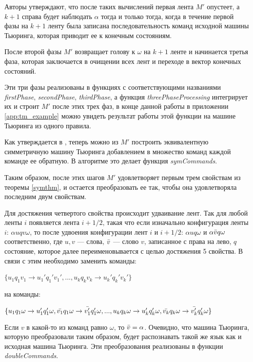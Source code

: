 \documentclass[14pt]{matmex-diploma-custom}
\begin{document}
Авторы утверждают, что после таких вычислений первая лента $M'$  опустеет, а $k+1$ справа будет наблюдать $\alpha$ тогда и только тогда, когда в течение первой фазы на $k+1$ ленту была записана последовательность команд исходной машины Тьюринга, которая приводит ее к конечным состояниям. 

После второй фазы $M'$ возвращает голову к $\omega$ на $k+1$ ленте и начинается третья фаза, которая заключается в очищении всех лент и переходе в вектор конечных состояний. 

Эти три фазы реализованы в функциях с соответствующими названиями \textit{firstPhase}, \textit{secondPhase}, \textit{thirdPhase}, а функция \textit{threePhaseProcessing} интегрирует их и строит $M'$ после этих трех фаз, в конце данной работы в приложении \ref{app:tm_example} можно увидеть результат работы этой функции на машине Тьюринга из одного правила. 

Как утверждается в \cite{symTM}, теперь можно из $M'$ построить эквивалентную симметричную машину Тьюринга добавлением в множество команд каждой команде ее обратную. В алгоритме это делает функция \textit{symCommands}. 

Таким образом, после этих шагов $M'$ удовлетворяет первым трем свойствам из теоремы \ref{symthm}, и остается преобразовать ее так, чтобы она удовлетворяла последним двум свойствам. 

Для достяжения четвертого свойства происходит удваивание лент. Так для любой ленты $i$ появляется лента $i + 1/2$, такая что если изначально конфигурация ленты $i$: $\alpha u q v \omega$, то после удвоения конфигурации лент $i$ и $i+1/2$: $\alpha u q \omega$ и $\alpha \Bar{v} q \omega$ соответственно, где $u,v$ --- слова, $\Bar{v}$ --- слово $v$, записанное с права на лево, $q$ состояние, которое далее переименовывается с целью достяжения 5 свойства. В связи с этим необходимо заменить команды:
\begin{center}
    $\{ u_1 q_1 v_1 \to u_1' q_1' v_1',  ... , u_k q_k v_k \to u_k' q_k' v_k' \}$
\end{center}
на команды:
\begin{center}
    $\{ u_1 q_1 \omega \to u_1' q_1' \omega, \Bar{v_1} q_1 \omega \to \Bar{v'_1} q_1' \omega , ... , u_k q_k \omega \to u_k' q_k' \omega, \Bar{v_k} q_k \omega \to \Bar{v'_k} q_k' \omega \}$
\end{center}
Если $v$ в какой-то из команд равно $\omega$, то $\Bar{v} = \alpha$. Очевидно, что машина Тьюринга, которую преобразовали таким образом, будет распознавать такой же язык как и исходная машина Тьюринга. Эти преобразования реализованы в функции \textit{doubleCommands}. 
\end{document}
